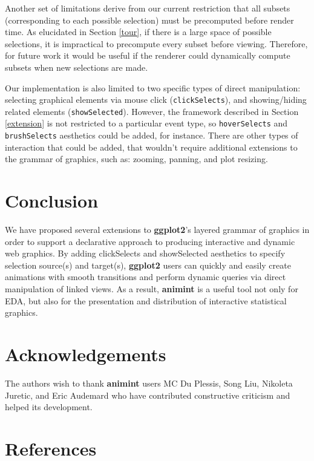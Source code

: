 \documentclass[12pt,]{article}
\theoremstyle{definition}
\theoremstyle{definition}
\theoremstyle{definition}
\theoremstyle{remark}
\begin{document}
Another set of limitations derive from our current restriction that all
subsets (corresponding to each possible selection) must be precomputed
before render time. As elucidated in Section \ref{tour}, if there is a
large space of possible selections, it is impractical to precompute
every subset before viewing. Therefore, for future work it would be
useful if the renderer could dynamically compute subsets when new
selections are made.

Our implementation is also limited to two specific types of direct
manipulation: selecting graphical elements via mouse click
(\texttt{clickSelects}), and showing/hiding related elements
(\texttt{showSelected}). However, the framework described in Section
\ref{extension} is not restricted to a particular event type, so
\texttt{hoverSelects} and \texttt{brushSelects} aesthetics could be
added, for instance. There are other types of interaction that could be
added, that wouldn't require additional extensions to the grammar of
graphics, such as: zooming, panning, and plot resizing.

\hypertarget{conclusion}{%
\section{Conclusion}\label{conclusion}}

We have proposed several extensions to \textbf{ggplot2}'s layered
grammar of graphics in order to support a declarative approach to
producing interactive and dynamic web graphics. By adding clickSelects
and showSelected aesthetics to specify selection source(s) and
target(s), \textbf{ggplot2} users can quickly and easily create
animations with smooth transitions and perform dynamic queries via
direct manipulation of linked views. As a result, \textbf{animint} is a
useful tool not only for EDA, but also for the presentation and
distribution of interactive statistical graphics.

\section*{Acknowledgements}

The authors wish to thank \textbf{animint} users MC Du Plessis, Song
Liu, Nikoleta Juretic, and Eric Audemard who have contributed
constructive criticism and helped its development.

\section*{References}
\end{document}
